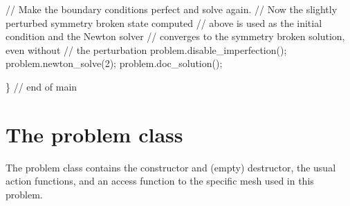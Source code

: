 \begin{DoxyCodeInclude}
 
 \textcolor{comment}{// Make the boundary conditions perfect and solve again. }
 \textcolor{comment}{// Now the slightly perturbed symmetry broken state computed}
 \textcolor{comment}{// above is used as the initial condition and the Newton solver}
 \textcolor{comment}{// converges to the symmetry broken solution, even without}
 \textcolor{comment}{// the perturbation}
 problem.disable\_imperfection();
 problem.newton\_solve(2);
 problem.doc\_solution();

\} \textcolor{comment}{// end of main}

\end{DoxyCodeInclude}




 

\hypertarget{index_problem}{}\section{The problem class}\label{index_problem}
The problem class contains the constructor and (empty) destructor, the usual action functions, and an access function to the specific mesh used in this problem.

